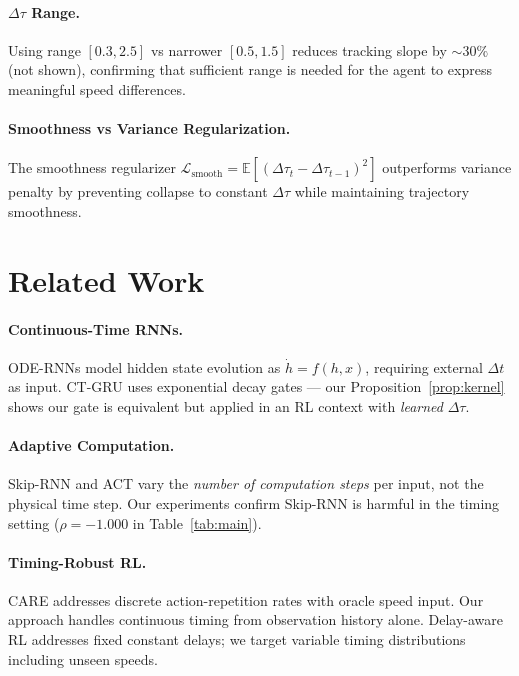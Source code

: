 \documentclass[10pt,twocolumn]{article}
\newcommand{\deltatau}{\Delta\tau}
\theoremstyle{plain}
\theoremstyle{definition}
\begin{document}
\paragraph{$\deltatau$ Range.}
Using range $[0.3, 2.5]$ vs narrower $[0.5, 1.5]$ reduces tracking slope
by $\sim\!30\%$ (not shown), confirming that sufficient range is needed
for the agent to express meaningful speed differences.

\paragraph{Smoothness vs Variance Regularization.}
The smoothness regularizer $\mathcal{L}_\text{smooth} = \mathbb{E}[({\deltatau}_t -
{\deltatau}_{t-1})^2]$ outperforms variance penalty by preventing collapse to
constant $\deltatau$ while maintaining trajectory smoothness.

\section{Related Work}
\label{sec:related}

\paragraph{Continuous-Time RNNs.}
ODE-RNNs \cite{rubanova2019latent,chen2018neural} model hidden state evolution
as $\dot{h} = f(h, x)$, requiring external $\Delta t$ as input.
CT-GRU \cite{mozer2017discrete} uses exponential decay gates --- our
Proposition~\ref{prop:kernel} shows our gate is equivalent but applied
in an RL context with \emph{learned} $\deltatau$.

\paragraph{Adaptive Computation.}
Skip-RNN \cite{campos2018skip} and ACT \cite{graves2016adaptive} vary the
\emph{number of computation steps} per input, not the physical time step.
Our experiments confirm Skip-RNN is harmful in the timing setting
($\rho = -1.000$ in Table~\ref{tab:main}).

\paragraph{Timing-Robust RL.}
CARE \cite{lim2022care} addresses discrete action-repetition rates with oracle
speed input. Our approach handles continuous timing from observation history alone.
Delay-aware RL \cite{firoiu2018human,ramstedt2019real} addresses fixed constant delays;
we target variable timing distributions including unseen speeds.
\end{document}
